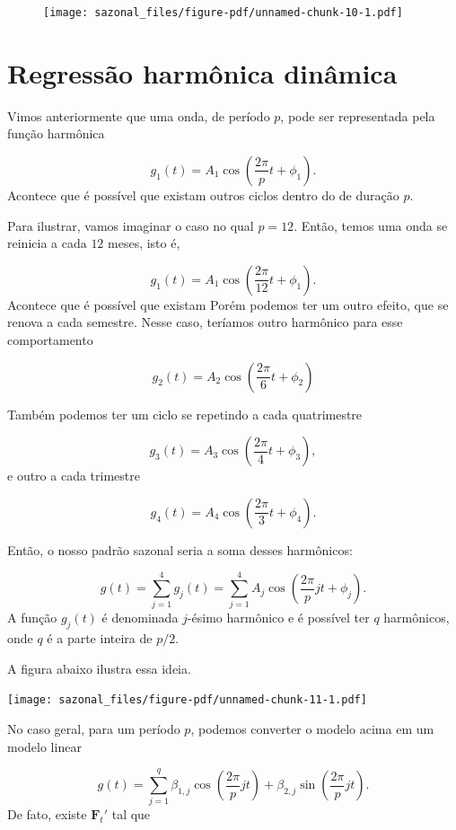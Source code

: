 \documentclass[
  letterpaper,
  DIV=11,
  numbers=noendperiod]{scrreprt}
\begin{document}
\begin{figure}[H]

{\centering \texttt{[image: sazonal\_files/figure-pdf/unnamed-chunk-10-1.pdf]}

}

\end{figure}

\hypertarget{regressuxe3o-harmuxf4nica-dinuxe2mica}{%
\section{Regressão harmônica
dinâmica}\label{regressuxe3o-harmuxf4nica-dinuxe2mica}}

Vimos anteriormente que uma onda, de período \(p\), pode ser
representada pela função harmônica

\[g_1(t)=A_1\cos\left(\frac{2\pi}{p}t+\phi_1\right).\] Acontece que é
possível que existam outros ciclos dentro do de duração \(p\).

Para ilustrar, vamos imaginar o caso no qual \(p=12\). Então, temos uma
onda se reinicia a cada \(12\) meses, isto é,

\[g_1(t)=A_1\cos\left(\frac{2\pi}{12}t+\phi_1\right).\] Acontece que é
possível que existam Porém podemos ter um outro efeito, que se renova a
cada semestre. Nesse caso, teríamos outro harmônico para esse
comportamento

\[g_2(t)=A_2\cos\left(\frac{2\pi}{6}t+\phi_2\right)\]

Também podemos ter um ciclo se repetindo a cada quatrimestre

\[g_3(t)=A_3\cos\left(\frac{2\pi}{4}t+\phi_3\right),\] e outro a cada
trimestre

\[g_4(t)=A_4\cos\left(\frac{2\pi}{3}t+\phi_4\right).\]

Então, o nosso padrão sazonal seria a soma desses harmônicos:

\[g(t)=\sum_{j=1}^4 g_{j}(t)=\sum_{j=1}^4 A_j\cos\left(\frac{2\pi}{p}jt+\phi_j\right).\]
A função \(g_j(t)\) é denominada \(j\)-ésimo harmônico e é possível ter
\(q\) harmônicos, onde \(q\) é a parte inteira de \(p/2\).

A figura abaixo ilustra essa ideia.

\texttt{[image: sazonal\_files/figure-pdf/unnamed-chunk-11-1.pdf]}

No caso geral, para um período \(p\), podemos converter o modelo acima
em um modelo linear

\[g(t)=\sum_{j=1}^{q} \beta_{1,j}\cos\left(\frac{2\pi}{p}jt\right)+\beta_{2,j}\sin\left(\frac{2\pi}{p}jt\right).\]
De fato, existe \(\boldsymbol{F}_t'\) tal que
\end{document}
